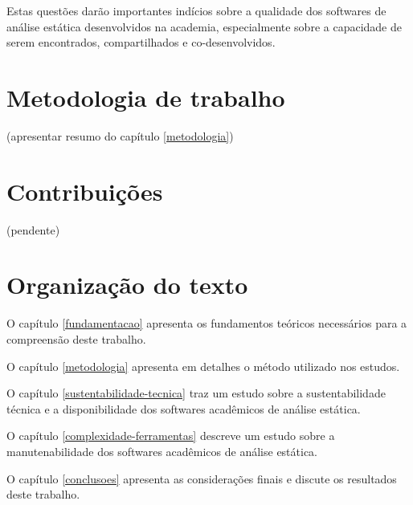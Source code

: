 Estas questões darão importantes indícios sobre a qualidade dos softwares de
análise estática desenvolvidos na academia, especialmente sobre a capacidade de
serem encontrados, compartilhados e co-desenvolvidos.

\section{Metodologia de trabalho}

(apresentar resumo do capítulo \ref{metodologia})

\section{Contribuições}

(pendente)

\section{Organização do texto}

O capítulo \ref{fundamentacao} apresenta os fundamentos teóricos necessários
para a compreensão deste trabalho.

O capítulo \ref{metodologia} apresenta em detalhes o método utilizado nos
estudos.

O capítulo \ref{sustentabilidade-tecnica} traz um estudo sobre a
sustentabilidade técnica e a disponibilidade dos softwares acadêmicos de
análise estática.

O capítulo \ref{complexidade-ferramentas} descreve um estudo sobre a
manutenabilidade dos softwares acadêmicos de análise estática.

O capítulo \ref{conclusoes} apresenta as considerações finais e discute os
resultados deste trabalho.
